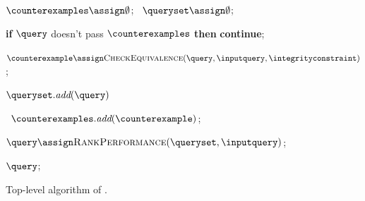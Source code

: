 \begin{figure}[!t]
\vspace{-5pt}
\footnotesize
\centering

\begin{algorithm}[H]
\begin{algorithmic}[1]


\Statex{}


\Statex{}

\vspace{2pt}

\State $\counterexamples \assign \emptyset$; \  $\queryset \assign \emptyset$; 
\label{slab:alg:toplevelalg:init}



\label{slab:alg:toplevelalg:whilebegin} 



 \label{slab:alg:toplevelalg:forloop}


\State \textbf{if} $\query$ doesn't pass  $\counterexamples$ \textbf{then} \textbf{continue}; \label{slab:alg:toplevelalg:satisfycounterexample}


\State $\counterexample \assign \textsc{CheckEquivalence}(\query, \inputquery, \integrityconstraint)$;\label{slab:alg:toplevelalg:checkequiv}

\vspace{1pt}

$\queryset.\emph{add}(\query)$
\label{slab:alg:toplevelalg:nocounterexample}

\Else \ $\counterexamples.\emph{add}( \counterexample )$;
\label{slab:alg:toplevelalg:addcounterexample}

\EndIf

\EndFor


\EndWhile
\label{slab:alg:toplevelalg:whileend}

\vspace{-1pt}
\State $\query \assign \textsc{RankPerformance}(\queryset, \inputquery)$;
\label{slab:alg:toplevelalg:checkfaster}

\State \Return $\query$;
\label{slab:alg:toplevelalg:returnquery}

\caption{{Top-level algorithm of \toolname.}}
\label{slab:alg:toplevelalg}
\end{algorithmic}
\end{algorithm}
\vspace{-10pt}
\end{figure}






